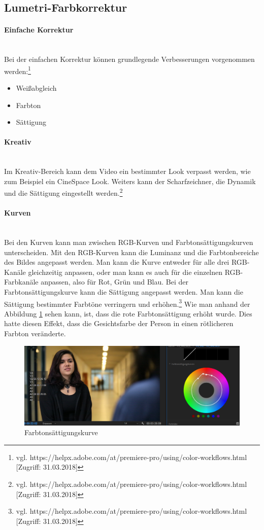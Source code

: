 \subsection{Lumetri-Farbkorrektur}
\paragraph{Einfache Korrektur}
\leavevmode \\
Bei der einfachen Korrektur können grundlegende Verbesserungen vorgenommen werden:\footnote{vgl. https://helpx.adobe.com/at/premiere-pro/using/color-workflows.html [Zugriff: 31.03.2018]}
\begin{itemize}
	\item Weißabgleich
	\item Farbton
	\item Sättigung
\end{itemize}
\paragraph{Kreativ}
\leavevmode \\
Im Kreativ-Bereich kann dem Video ein bestimmter Look verpasst werden, wie zum Beispiel ein CineSpace Look. Weiters kann der Scharfzeichner, die Dynamik und die Sättigung eingestellt werden.\footnote{vgl. https://helpx.adobe.com/at/premiere-pro/using/color-workflows.html [Zugriff: 31.03.2018]}
\paragraph{Kurven}
\leavevmode \\
Bei den Kurven kann man zwischen RGB-Kurven und Farbtonsättigungskurven unterscheiden.\newline
Mit den RGB-Kurven kann die Luminanz und die Farbtonbereiche des Bildes angepasst werden. Man kann die Kurve entweder für alle drei RGB-Kanäle gleichzeitig anpassen, oder man kann es auch für die einzelnen RGB-Farbkanäle anpassen, also für Rot, Grün und Blau.\newline
Bei der Farbtonsättigungskurve kann die Sättigung angepasst werden. Man kann die Sättigung bestimmter Farbtöne verringern und erhöhen.\footnote{vgl. https://helpx.adobe.com/at/premiere-pro/using/color-workflows.html [Zugriff: 31.03.2018]}\newline
Wie man anhand der Abbildung \ref{fig:abb19} sehen kann, ist, dass die rote Farbtonsättigung erhöht wurde. Dies hatte diesen Effekt, dass die Gesichtsfarbe der Person in einen rötlicheren Farbton veränderte.
\begin{figure}[H]
	\centering
	\includegraphics[width=1.0\textwidth]{abb19} 
	\caption{Farbtonsättigungskurve}\label{fig:abb19}
\end{figure}
